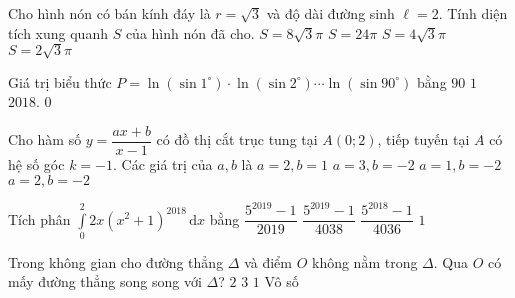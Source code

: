\begin{ex}%
Cho hình nón có bán kính đáy là $r=\sqrt{3}$ và độ dài đường sinh $\ell=2$. Tính diện tích xung quanh $S$ của hình nón đã cho.
\choice
{ $S=8\sqrt{3}\pi $}
{ $S=24\pi $}
{ $S=4\sqrt{3}\pi $}
{\True $S=2\sqrt{3}\pi $}
\end{ex}
\begin{ex}%
Giá trị biểu thức $P=\ln (\sin 1^{\circ})\cdot\ln (\sin 2^{\circ})\cdots \ln (\sin 90^{\circ})$ bằng
\choice
{ $90$}
{ $1$}
{ $2018.$}
{\True $0$}
\end{ex}
\begin{ex}%
Cho hàm số $y=\dfrac{ax+b}{x-1}$ có đồ thị cắt trục tung tại $A(0; 2)$, tiếp tuyến tại $A$ có hệ số góc
$k = -1$. Các giá trị của $a, b$ là
\choice
{ $a = 2, b=1$}
{\True $a = 3, b=-2$}
{ $a = 1, b=-2$}
{ $a = 2, b=-2$}
\end{ex}
\begin{ex}%
Tích phân $\displaystyle\int\limits_0^2{2x( x^2+1 )^{2018}\mathrm{\,d}x}$ bằng
\choice
{\True $\dfrac{5^{2019}-1}{2019}$}
{ $\dfrac{5^{2019}-1}{4038}$}
{ $\dfrac{5^{2018}-1}{4036}$}
{ $1$}
\end{ex}
\begin{ex}%
Trong không gian cho đường thẳng $\Delta$ và điểm $O$ không nằm trong $\Delta$. Qua $O$ có mấy đường thẳng song song với $\Delta$?
\choice
{$ 2$}
{ $3$}
{\True $1$}
{ Vô số}
\end{ex}
